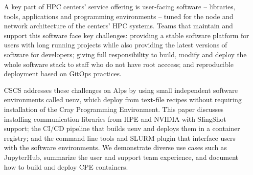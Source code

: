 A key part of HPC centers' service offering is user-facing software -- libraries, tools, applications and programming environments -- tuned for the node and network architecture of the centers' HPC systems.
Teams that maintain and support this software face key challenges: providing a stable software platform for users with long running projects while also providing the latest versions of software for developers; giving full responsibility to build, modify and deploy the whole software stack to staff who do not have root acccess; and reproducible deployment based on GitOps practices.

CSCS addresses these challenges on Alps by using small independent software environments called uenv, which deploy from text-file recipes without requiring installation of the Cray Programming Environment.
This paper discusses installing communication libraries from HPE and NVIDIA with SlingShot support; the CI/CD pipeline that builds uenv and deploys them in a container registry; and the command line tools and SLURM plugin that interface users with the software environments.
We demonstrate diverse use cases such as JupyterHub, summarize the user and support team experience, and document how to build and deploy CPE containers.

